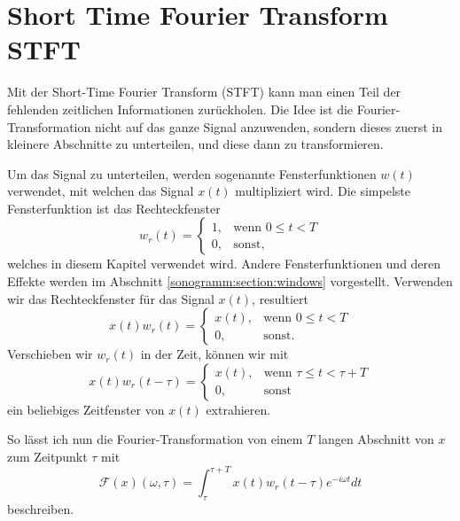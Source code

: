 %
%
%
%
\section{Short Time Fourier Transform STFT\label{sonogramm:section:teil0}}
Mit der Short-Time Fourier Transform (STFT) kann man einen Teil der fehlenden zeitlichen Informationen zurückholen.
Die Idee ist die Fourier-Transformation nicht auf das ganze Signal anzuwenden, sondern dieses zuerst in kleinere
Abschnitte zu unterteilen, und diese dann zu transformieren.

Um das Signal zu unterteilen, werden sogenannte Fensterfunktionen $w(t)$ verwendet, mit welchen das Signal
%
$x(t)$ multipliziert wird.
Die simpelste Fensterfunktion ist das Rechteckfenster
%
\begin{equation}
    w_r(t) = 
        \begin{cases}
        1,& \text{wenn } 0 \le t < T\\
        0, & \text{sonst, }
        \end{cases}
\end{equation}
welches in diesem Kapitel verwendet wird.
Andere Fensterfunktionen und deren Effekte werden im Abschnitt \ref{sonogramm:section:windows} vorgestellt.
Verwenden wir das Rechteckfenster für das Signal $x(t)$, resultiert 
\begin{equation}
    x(t) w_r(t) = 
    \begin{cases}
    x(t),& \text{wenn } 0 \le t < T\\
    0, & \text{sonst.}
    \end{cases}
\end{equation}
Verschieben wir $w_r(t)$ in der Zeit, können wir mit 
\begin{equation}
    x(t) w_r(t-\tau) = 
    \begin{cases}
        x(t),& \text{wenn } \tau \le t < \tau + T\\
        0, & \text{sonst}
    \end{cases}
\end{equation}
ein beliebiges Zeitfenster von $x(t)$ extrahieren.

So lässt ich nun die Fourier-Transformation von einem $T$ langen Abschnitt
von $x$ zum Zeitpunkt $\tau$ mit
\begin{equation}
    \mathscr{F}(x)(\omega, \tau) = \int_{\tau}^{\tau+T} x(t) w_r(t - \tau) e^{-i \omega t} dt
\end{equation}
beschreiben.

